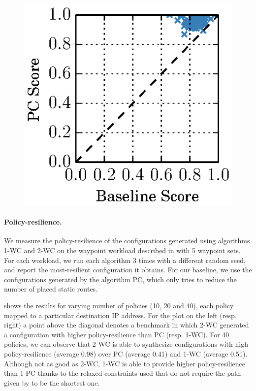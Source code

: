 \begin{figure}
	\begin{center}
		\includegraphics[width=0.20\columnwidth]{figures/ospfbaselineresilience.eps}
	\end{center} 
\end{figure}


\paragraph{Policy-resilience.}
We measure the policy-resilience of the configurations 
generated using algorithms  1-WC and 2-WC on the waypoint workload described in
 with 5 waypoint sets. 
For each workload, we run each algorithm 
3 times with a different random seed, and report the most-resilient configuration it obtains.
For our baseline, we use the configurations generated by the algorithm PC, which
only tries to reduce the number of placed static routes.

shows the results
for varying number of policies (10, 20 and 40), each policy mapped 
to a particular destination IP address. 
For the plot on the left (resp. right)
a point above the diagonal 
denotes a benchmark in which 2-WC
generated a configuration with higher policy-resilience than
PC (resp. 1-WC).
For 40 policies, 
we can observe that 2-WC is able to synthesize 
configurations with high policy-resilience
(average 0.98) over PC (average 0.41) and 1-WC (average 0.51). 
Although not as good as 2-WC, 1-WC is able to provide higher policy-resilience than
1-PC thanks to the relaxed constraints used that do not require
the path given by \genesis to be the shortest one.

